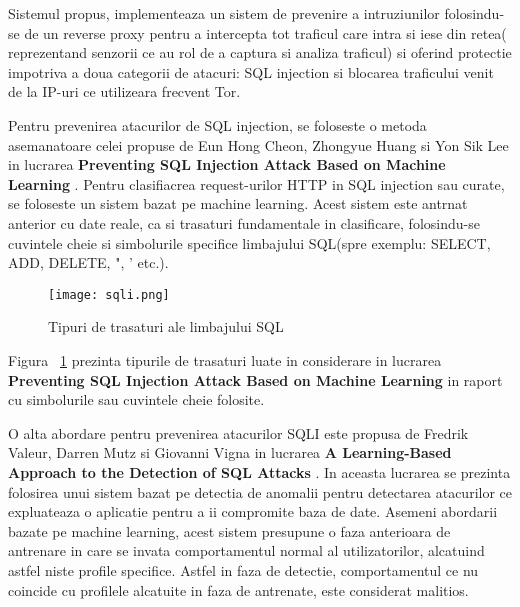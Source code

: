 Sistemul propus, \textit{\thesistitle} implementeaza un sistem de prevenire a intruziunilor folosindu-se de un reverse proxy pentru a intercepta tot traficul care intra si iese din retea( reprezentand senzorii ce au rol de a captura si analiza traficul) si oferind protectie impotriva a doua categorii de atacuri: SQL injection si blocarea traficului venit de la IP-uri ce utilizeara frecvent Tor.

Pentru prevenirea atacurilor de SQL injection, se foloseste o metoda asemanatoare celei propuse de Eun Hong Cheon, Zhongyue Huang si Yon Sik Lee in lucrarea \textbf{Preventing SQL Injection Attack Based on Machine Learning} \cite{sqli_how}. Pentru clasifiacrea request-urilor HTTP in SQL injection sau curate, se foloseste un sistem bazat pe machine learning. Acest sistem este antrnat anterior cu date reale, ca si trasaturi fundamentale in clasificare, folosindu-se cuvintele cheie si simbolurile specifice limbajului SQL(spre exemplu: SELECT, ADD, DELETE, ", ' etc.).

\begin{figure}[h]
\centering
\texttt{[image: sqli.png]}
\caption{Tipuri de trasaturi ale limbajului SQL}
\label{fig:sql-features}
\end{figure}

Figura ~\ref{fig:sql-features} prezinta tipurile de trasaturi luate in considerare in lucrarea \textbf{Preventing SQL Injection Attack Based on Machine Learning} in raport cu simbolurile sau cuvintele cheie folosite. 


O alta abordare pentru prevenirea atacurilor SQLI este propusa de Fredrik Valeur, Darren Mutz si Giovanni Vigna in lucrarea \textbf{A Learning-Based Approach to the Detection of SQL Attacks} \cite{sqli_how2}. In aceasta lucrarea se prezinta folosirea unui sistem bazat pe detectia de anomalii pentru detectarea atacurilor ce expluateaza o aplicatie pentru a ii compromite baza de date. Asemeni abordarii bazate pe machine learning, acest sistem presupune o faza anterioara de antrenare in care se invata comportamentul normal al utilizatorilor, alcatuind astfel niste profile specifice. Astfel in faza de detectie, comportamentul ce nu coincide cu profilele alcatuite in faza de antrenate, este considerat malitios.

